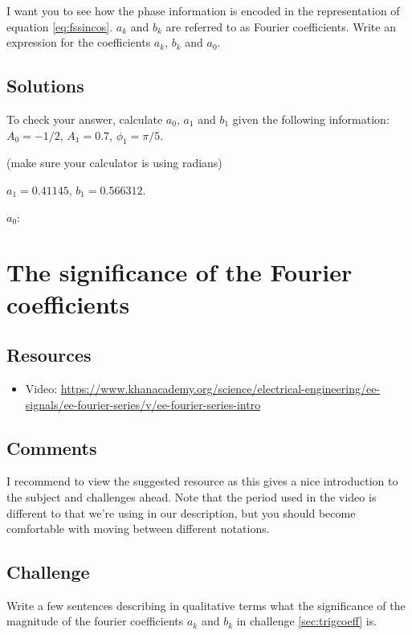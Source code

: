 I want you to see how the phase information is encoded in the representation of equation \ref{eq:fssincos}. $a_k$ and $b_k$ are referred to as Fourier coefficients. Write an expression for the coefficients $a_k$, $b_k$ and $a_0$.

\subsection*{Solutions}
To check your answer, calculate $a_0$, $a_1$ and $b_1$ given the following information:\\
$A_0=-1/2$, $A_1 = 0.7$, $\phi_1 = \pi/5$.

(make sure your calculator is using radians)

$a_1 = 0.41145$, $b_1 = 0.566312$.

$a_0$:




\newpage

\section{The significance of the Fourier coefficients}

\subsection*{Resources}
\begin{itemize}
    \item Video: \url{https://www.khanacademy.org/science/electrical-engineering/ee-signals/ee-fourier-series/v/ee-fourier-series-intro}
\end{itemize}

\subsection*{Comments}
I recommend to view the suggested resource as this gives a nice introduction to the subject and challenges ahead. Note that the period used in the video is different to that we're using in our description, but you should become comfortable with moving between different notations.

\subsection*{Challenge}
Write a few sentences describing in qualitative terms what the significance of the magnitude of the fourier coefficients $a_k$ and $b_k$ in challenge \ref{sec:trigcoeff} is.

